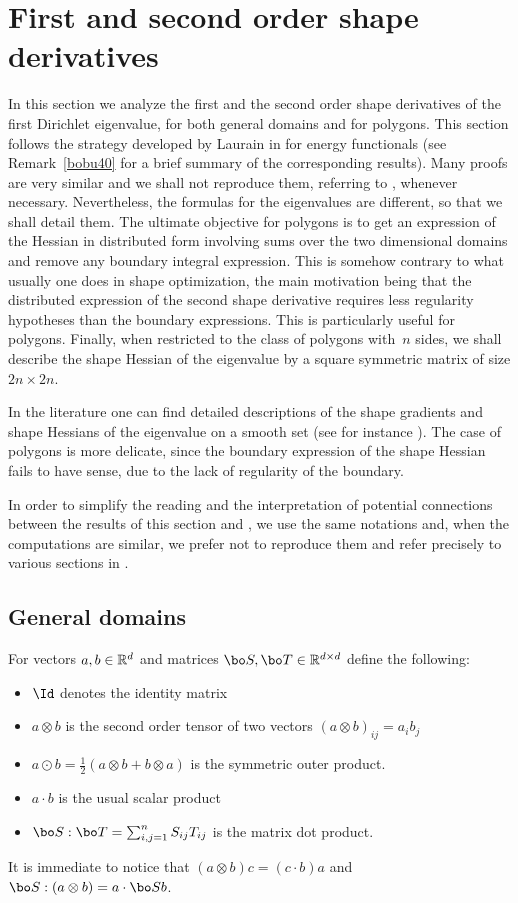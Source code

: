 \section{First and second order shape derivatives}\label{bobu200.s2}
In this section we analyze the first and the second order shape derivatives of the first Dirichlet eigenvalue, for both general domains and for polygons. This section follows the strategy developed by Laurain in \cite{laurain2ndDeriv} for energy functionals (see Remark~\ref{bobu40} for a brief summary of the corresponding results). Many proofs are very similar and we shall not reproduce them, referring to \cite{laurain2ndDeriv}, whenever necessary. Nevertheless, the formulas for the eigenvalues are different, so that we shall detail them. The ultimate objective for polygons is to get an expression of the Hessian in distributed form involving sums over the two dimensional domains and remove any boundary integral expression. This is somehow contrary to what usually one does in shape optimization, the main motivation being that the distributed expression of the second shape derivative requires less regularity hypotheses than the boundary expressions. This is particularly useful for polygons. Finally, when restricted to the class of polygons with~$n$ sides, we shall describe the shape Hessian of the eigenvalue by a square symmetric matrix of size $2n\times 2n$.

In the literature one can find detailed descriptions of the shape gradients and shape Hessians of the eigenvalue on a smooth set (see for instance \cite{henrot-pierre-english, HPR04, LNM16,DL19}). The case of polygons is more delicate, since the boundary expression of the shape Hessian fails to have sense, due to the lack of regularity of the boundary.

In order to simplify the reading and the interpretation of potential connections between the results of this section and \cite{laurain2ndDeriv}, we use the same notations and, when the computations are similar, we prefer not to reproduce them and refer precisely to various sections in \cite{laurain2ndDeriv}.
\subsection{General domains}
For vectors $a,b \in \Bbb{R}^d$ and matrices $\bo S, \bo T\in \Bbb{R}^{d\times d}$ define the following:
\begin{itemize}
\item $\Id$ denotes the identity matrix
\item $a \otimes b$ is the second order tensor of two vectors $(a\otimes b)_{ij} = a_ib_j$
\item $a\odot b = \frac{1}{2} (a\otimes b+b\otimes a)$ is the symmetric outer product.
\item $a \cdot b$ is the usual scalar product
\item $\bo S : \bo T = \sum_{i,j=1}^n S_{ij}T_{ij}$ is the matrix dot product.
\end{itemize}
It is immediate to notice that $(a\otimes b)c = (c\cdot b)a$ and $\bo S: (a\otimes b) = a \cdot \bo S b$.

